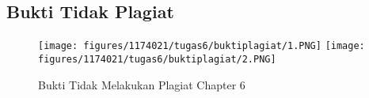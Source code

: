 \subsection{Bukti Tidak Plagiat}
\begin{figure}[H]
\centering
	\texttt{[image: figures/1174021/tugas6/buktiplagiat/1.PNG]}
	\texttt{[image: figures/1174021/tugas6/buktiplagiat/2.PNG]}
	\caption{Bukti Tidak Melakukan Plagiat Chapter 6}
\end{figure}

